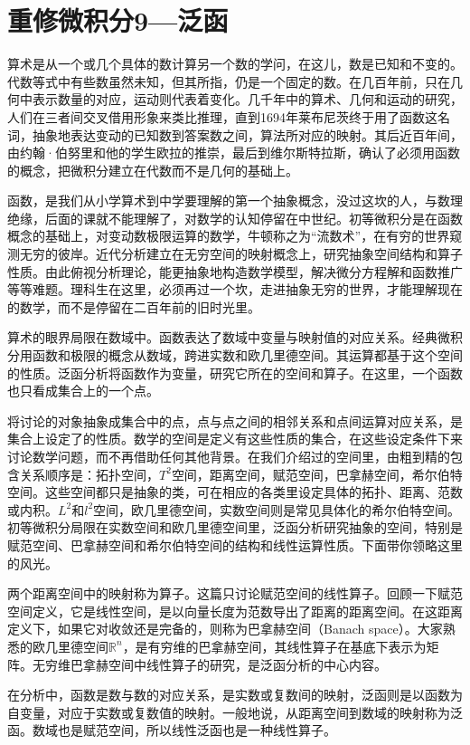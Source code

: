 \chapter{重修微积分9---泛函}

算术是从一个或几个具体的数计算另一个数的学问，在这儿，数是已知和不变的。代数等式中有些数虽然未知，但其所指，仍是一个固定的数。在几百年前，只在几何中表示数量的对应，运动则代表着变化。几千年中的算术、几何和运动的研究，人们在三者间交叉借用形象来类比推理，直到1694年莱布尼茨终于用了函数这名词，抽象地表达变动的已知数到答案数之间，算法所对应的映射。其后近百年间，由约翰·伯努里和他的学生欧拉的推崇，最后到维尔斯特拉斯，确认了必须用函数的概念，把微积分建立在代数而不是几何的基础上。

函数，是我们从小学算术到中学要理解的第一个抽象概念，没过这坎的人，与数理绝缘，后面的课就不能理解了，对数学的认知停留在中世纪。初等微积分是在函数概念的基础上，对变动数极限运算的数学，牛顿称之为``流数术''，在有穷的世界窥测无穷的彼岸。近代分析建立在无穷空间的映射概念上，研究抽象空间结构和算子性质。由此俯视分析理论，能更抽象地构造数学模型，解决微分方程解和函数推广等等难题。理科生在这里，必须再过一个坎，走进抽象无穷的世界，才能理解现在的数学，而不是停留在二百年前的旧时光里。

算术的眼界局限在数域中。函数表达了数域中变量与映射值的对应关系。经典微积分用函数和极限的概念从数域，跨进实数和欧几里德空间。其运算都基于这个空间的性质。泛函分析将函数作为变量，研究它所在的空间和算子。在这里，一个函数也只看成集合上的一个点。

将讨论的对象抽象成集合中的点，点与点之间的相邻关系和点间运算对应关系，是集合上设定了的性质。数学的空间是定义有这些性质的集合，在这些设定条件下来讨论数学问题，而不再借助任何其他背景。在我们介绍过的空间里，由粗到精的包含关系顺序是：拓扑空间，$ T^2 $空间，距离空间，赋范空间，巴拿赫空间，希尔伯特空间。这些空间都只是抽象的类，可在相应的各类里设定具体的拓扑、距离、范数或内积。$ L^2 $和$ l^2 $空间，欧几里德空间，实数空间则是常见具体化的希尔伯特空间。初等微积分局限在实数空间和欧几里德空间里，泛函分析研究抽象的空间，特别是赋范空间、巴拿赫空间和希尔伯特空间的结构和线性运算性质。下面带你领略这里的风光。

两个距离空间中的映射称为算子。这篇只讨论赋范空间的线性算子。回顾一下赋范空间定义，它是线性空间，是以向量长度为范数导出了距离的距离空间。在这距离定义下，如果它对收敛还是完备的，则称为巴拿赫空间（Banach space）。大家熟悉的欧几里德空间$\mathbb{R}^n$，是有穷维的巴拿赫空间，其线性算子在基底下表示为矩阵。无穷维巴拿赫空间中线性算子的研究，是泛函分析的中心内容。

在分析中，函数是数与数的对应关系，是实数或复数间的映射，泛函则是以函数为自变量，对应于实数或复数值的映射。一般地说，从距离空间到数域的映射称为泛函。数域也是赋范空间，所以线性泛函也是一种线性算子。


